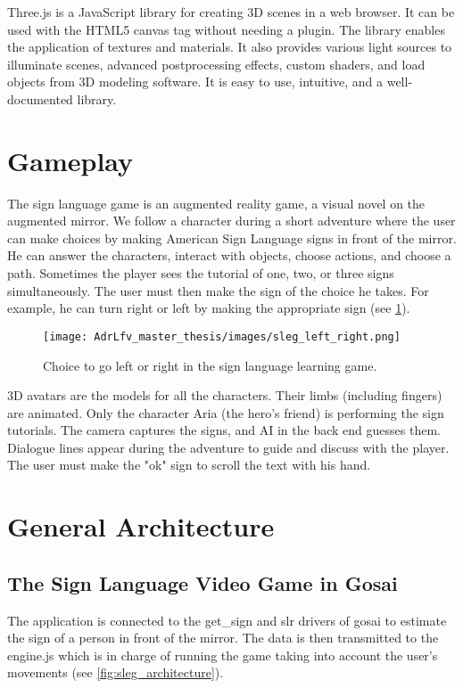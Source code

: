 Three.js is a JavaScript library for creating 3D scenes in a web browser. It can be used with the HTML5 canvas tag without needing a plugin. The library enables the application of textures and materials. It also provides various light sources to illuminate scenes, advanced postprocessing effects, custom shaders, and load objects from 3D modeling software. It is easy to use, intuitive, and a well-documented library.

\section{Gameplay}

The sign language game is an augmented reality game, a visual novel on the augmented mirror. We follow a character during a short adventure where the user can make choices by making American Sign Language signs in front of the mirror. He can answer the characters, interact with objects, choose actions, and choose a path. 
Sometimes the player sees the tutorial of one, two, or three signs simultaneously. The user must then make the sign of the choice he takes. For example, he can turn right or left by making the appropriate sign (see \ref{fig:sleg_left_right}). 

\begin{figure}[h]
    \centering
    \texttt{[image: AdrLfv\_master\_thesis/images/sleg\_left\_right.png]}
    \caption{Choice to go left or right in the sign language learning game.}
    \label{fig:sleg_left_right}
\end{figure}

3D avatars are the models for all the characters. Their limbs (including fingers) are animated. Only the character Aria (the hero's friend) is performing the sign tutorials.
The camera captures the signs, and AI in the back end guesses them. Dialogue lines appear during the adventure to guide and discuss with the player. The user must make the "ok" sign to scroll the text with his hand.


\section{General Architecture}

\subsection{The Sign Language Video Game in Gosai}

The application is connected to the get\_sign and slr drivers of gosai to estimate the sign of a person in front of the mirror. The data is then transmitted to the engine.js which is in charge of running the game taking into account the user's movements (see \ref{fig:sleg_architecture}).

